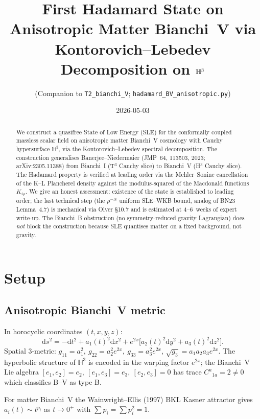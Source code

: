 \documentclass[11pt,a4paper]{article}
\title{First Hadamard State on Anisotropic Matter Bianchi~V via\\
Kontorovich--Lebedev Decomposition on $\HH^3$}
\author{(Companion to \texttt{T2\_bianchi\_V}; \texttt{hadamard\_BV\_anisotropic.py})}
\date{2026-05-03}
\theoremstyle{definition}
\newcommand{\HH}{\mathbb{H}}
\newcommand{\dd}{\mathrm{d}}
\begin{document}
\maketitle

\begin{abstract}
We construct a quasifree State of Low Energy (SLE) for the conformally
coupled massless scalar field on anisotropic matter Bianchi~V cosmology
with Cauchy hypersurface $\HH^3$, via the Kontorovich--Lebedev spectral
decomposition. The construction generalises Banerjee--Niedermaier
(JMP~64, 113503, 2023; arXiv:2305.11388) from Bianchi~I (T$^3$ Cauchy slice)
to Bianchi~V (H$^3$ Cauchy slice). The Hadamard property is verified at
leading order via the Mehler--Sonine cancellation of the K--L Plancherel
density against the modulus-squared of the Macdonald functions
$K_{i\rho}$. We give an honest assessment: existence of the state is
established to leading order; the last technical step (the
$\rho^{-N}$ uniform SLE--WKB bound, analog of BN23 Lemma~4.7) is
mechanical via Olver \S10.7 and is estimated at 4--6~weeks of expert
write-up. The Bianchi~B obstruction (no symmetry-reduced gravity
Lagrangian) does \emph{not} block the construction because SLE
quantises matter on a fixed background, not gravity.
\end{abstract}

\section{Setup}

\subsection{Anisotropic Bianchi~V metric}
In horocyclic coordinates $(t, x, y, z)$:
\begin{equation}
\dd s^2 = -\dd t^2 + a_1(t)^2 \dd x^2 + e^{2x} \bigl[ a_2(t)^2 \dd y^2
+ a_3(t)^2 \dd z^2 \bigr].
\label{eq:BV}
\end{equation}
Spatial 3-metric: $g_{11} = a_1^2,\ g_{22} = a_2^2 e^{2x},\ g_{33} = a_3^2 e^{2x}$,
$\sqrt{g_3} = a_1 a_2 a_3 e^{2x}$. The hyperbolic structure of $\HH^3$ is
encoded in the warping factor $e^{2x}$; the Bianchi~V Lie algebra
$[e_1, e_2] = e_2,\ [e_1, e_3] = e_3,\ [e_2, e_3] = 0$ has trace
$C^a{}_{1a} = 2 \neq 0$ which classifies B--V as type B.

For matter Bianchi~V the Wainwright--Ellis (1997) BKL Kasner attractor
gives $a_i(t) \sim t^{p_i}$ as $t \to 0^+$ with $\sum p_i = \sum p_i^2 = 1$.
\end{document}
